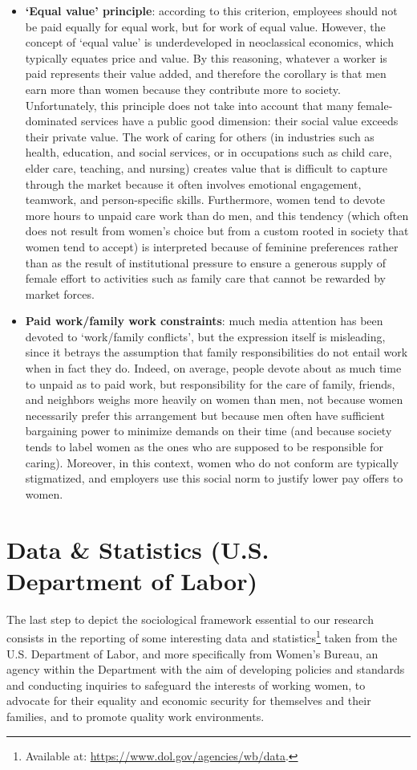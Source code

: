\begin{itemize}
\item \textbf{`Equal value' principle}: according to this criterion, employees should not be paid equally for equal work, but for work of equal value. However, the concept of `equal value' is underdeveloped in neoclassical economics, which typically equates price and value. By this reasoning, whatever a worker is paid represents their value added, and therefore the corollary is that men earn more than women because they contribute more to society. Unfortunately, this principle does not take into account that many female-dominated services have a public good dimension: their social value exceeds their private value. The work of caring for others (in industries such as health, education, and social services, or in occupations such as child care, elder care, teaching, and nursing) creates value that is difficult to capture through the market because it often involves emotional engagement, teamwork, and person-specific skills. Furthermore, women tend to devote more hours to unpaid care work than do men, and this tendency (which often does not result from women's choice but from a custom rooted in society that women tend to accept) is interpreted because of feminine preferences rather than as the result of institutional pressure to ensure a generous supply of female effort to activities such as family care that cannot be rewarded by market forces.
\item \textbf{Paid work/family work constraints}: much media attention has been devoted to `work/family conflicts', but the expression itself is misleading, since it betrays the assumption that family responsibilities do not entail work when in fact they do. Indeed, on average, people devote about as much time to unpaid as to paid work, but responsibility for the care of family, friends, and neighbors weighs more heavily on women than men, not because women necessarily prefer this arrangement but because men often have sufficient bargaining power to minimize demands on their time (and because society tends to label women as the ones who are supposed to be responsible for caring). Moreover, in this context, women who do not conform are typically stigmatized, and employers use this social norm to justify lower pay offers to women.
\end{itemize}


\section{Data \& Statistics (U.S. Department of Labor)}
\label{section:data_statistics_dol}
The last step to depict the sociological framework essential to our research consists in the reporting of some interesting data and statistics\footnote{Available at: \url{https://www.dol.gov/agencies/wb/data}.} taken from the U.S. Department of Labor, and more specifically from Women's Bureau, an agency within the Department with the aim of developing policies and standards and conducting inquiries to safeguard the interests of working women, to advocate for their equality and economic security for themselves and their families, and to promote quality work environments.

